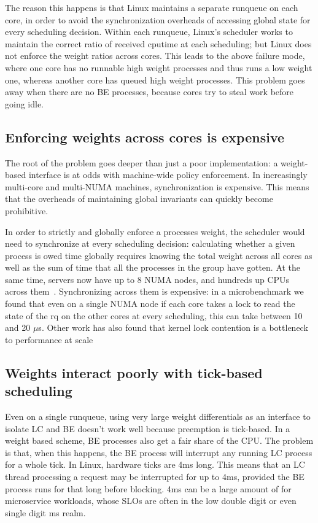 The reason this happens is that Linux maintains a separate runqueue on each
core, in order to avoid the synchronization overheads of accessing global state
for every scheduling decision. Within each runqueue, Linux's scheduler works to maintain the
correct ratio of received cputime at each scheduling; but Linux does not enforce
the weight ratios across cores. This leads to the above failure mode, where one
core has no runnable high weight processes and thus runs a low weight one,
whereas another core has queued high weight processes. This problem goes away
when there are no BE processes, because cores try to steal work before going
idle.

\subsection{Enforcing weights across cores is
expensive}\label{ss:problem:cross-core-hard}

The root of the problem goes deeper than just a poor implementation: a
weight-based interface is at odds with machine-wide policy enforcement. In
increasingly multi-core and multi-NUMA machines, synchronization is expensive.
This means that the overheads of maintaining global invariants can quickly
become prohibitive.

In order to strictly and globally enforce a processes weight, the scheduler
would need to synchronize at every scheduling decision: calculating whether a
given process is owed time globally requires knowing the total weight across all
cores as well as the sum of time that all the processes in the group have
gotten. At the same time, servers now have up to 8 NUMA nodes, and hundreds up
CPUs across them~\cite{TODO}. Synchronizing across them is expensive: in a
microbenchmark we found that even on a single NUMA node if each core takes a
lock to read the state of the rq on the other cores at every scheduling, this
can take between 10 and 20 $\mu$s. Other work has also found that kernel lock
contention is a bottleneck to performance at scale~\cite{TODO}


\subsection{Weights interact poorly with tick-based
scheduling}\label{ss:problem:quantum}

Even on a single runqueue, using very large weight differentials as an interface
to isolate LC and BE doesn't work well because preemption is tick-based. In a
weight based scheme, BE processes also get a fair share of the CPU. The problem
is that, when this happens, the BE process will interrupt any running LC process
for a whole tick. In Linux, hardware ticks are 4ms long. This means that an LC
thread processing a request may be interrupted for up to 4ms, provided the BE
process runs for that long before blocking. 4ms can be a large amount of for
microservice workloads, whose SLOs are often in the low double digit or even
single digit ms realm.~\cite{TODO}




